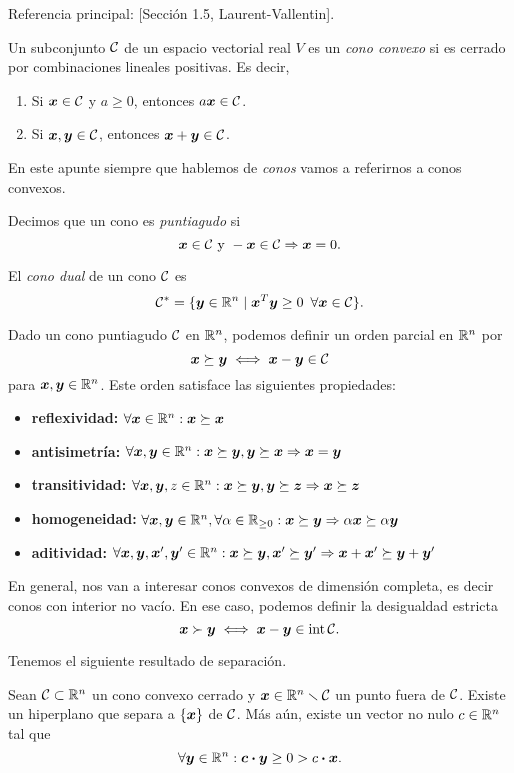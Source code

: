 Referencia principal: [Sección 1.5, Laurent-Vallentin].

Un subconjunto $\mathcal{C}$ de un espacio vectorial real $V$ es un \emph{cono convexo} si es cerrado por combinaciones lineales positivas. Es decir,
\begin{enumerate}
\item Si $\bm{x} \in \mathcal{C}$ y $a \ge 0$, entonces $a\bm{x} \in \mathcal{C}$.
\item Si $\bm{x}, \bm{y} \in \mathcal{C}$, entonces $\bm{x} + \bm{y} \in \mathcal{C}$.
\end{enumerate}

En este apunte siempre que hablemos de \emph{conos} vamos a referirnos a conos convexos.

Decimos que un cono es \emph{puntiagudo} si
$$
\bm{x}  \in \mathcal{C} \text{ y } -\bm{x} \in \mathcal{C} \Rightarrow \bm{x} = 0.
$$

El \emph{cono dual} de un cono $\mathcal{C}$ es
$$
\mathcal{C}^* = \{\bm{y} \in \mathbb{R}^n \mid \bm{x}^T \bm{y} \ge 0 \enspace \forall \bm{x} \in \mathcal{C}\}.
$$

Dado un cono puntiagudo $\mathcal{C}$ en $\mathbb{R}^n$, podemos definir un orden parcial en $\mathbb{R}^n$ por
$$
\bm{x} \succeq \bm{y} \iff \bm{x} - \bm{y} \in \mathcal{C}
$$
para $\bm{x}, \bm{y} \in \mathbb{R}^n$. Este orden satisface las siguientes propiedades:
\begin{itemize}
\item \textbf{reflexividad:} $\forall \bm{x} \in \mathbb{R}^n: \bm{x} \succeq \bm{x}$
\item \textbf{antisimetría:} $\forall \bm{x}, \bm{y} \in \mathbb{R}^n: \bm{x} \succeq \bm{y}, \bm{y} \succeq \bm{x} \Rightarrow \bm{x} = \bm{y}$
\item \textbf{transitividad:} $\forall \bm{x}, \bm{y}, z \in \mathbb{R}^n: \bm{x} \succeq \bm{y}, \bm{y} \succeq \bm{z} \Rightarrow \bm{x} \succeq \bm{z}$
\item \textbf{homogeneidad:} $\forall \bm{x}, \bm{y} \in \mathbb{R}^n, \forall \alpha \in \mathbb{R}_{\ge 0}: \bm{x} \succeq \bm{y} \Rightarrow \alpha \bm{x} \succeq \alpha \bm{y}$
\item \textbf{aditividad:} $\forall \bm{x}, \bm{y}, \bm{x}', \bm{y}' \in \mathbb{R}^n: \bm{x} \succeq \bm{y}, \bm{x}' \succeq \bm{y}' \Rightarrow \bm{x} + \bm{x}' \succeq \bm{y} + \bm{y}'$
\end{itemize}

En general, nos van a interesar conos convexos de dimensión completa, es decir conos con interior no vacío. En ese caso, podemos definir la desigualdad estricta
$$
\bm{x} \succ \bm{y} \iff \bm{x} - \bm{y} \in \operatorname{int} \mathcal{C}.
$$

Tenemos el siguiente resultado de separación.

\begin{lemma} Sean $\mathcal{C} \subset \mathbb{R}^n$ un cono convexo cerrado y $\bm{x} \in \mathbb{R}^n \smallsetminus \mathcal{C}$ un punto fuera de $\mathcal{C}$. Existe un hiperplano que separa a $\{\bm{x}\}$ de $\mathcal{C}$. Más aún, existe un vector no nulo $c \in \mathbb{R}^n$ tal que
$$
\forall \bm{y} \in \mathbb{R}^n : \bm{c} \boldsymbol{\cdot} \bm{y} \ge 0 > c \boldsymbol{\cdot} \bm{x}.
$$
\end{lemma}

